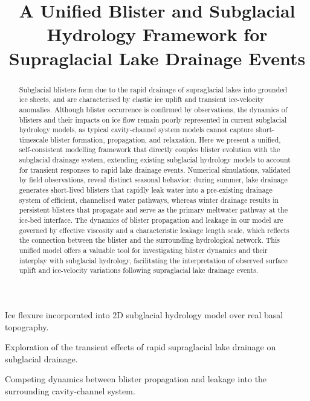 \documentclass[draft]{agujournal2019}
\begin{document}
\title{A Unified Blister and Subglacial Hydrology Framework for Supraglacial Lake Drainage Events}




\begin{keypoints}

\item Ice flexure incorporated into 2D subglacial hydrology model over real basal topography.

\item Exploration of the transient effects of rapid supraglacial lake drainage on subglacial drainage.

\item Competing dynamics between blister propagation and leakage into the surrounding cavity-channel system.

\end{keypoints}

\begin{abstract}
Subglacial blisters form due to the rapid drainage of supraglacial lakes into grounded ice sheets, and are characterised by elastic ice uplift and transient ice-velocity anomalies. Although blister occurrence is confirmed by observations, the dynamics of blisters and their impacts on ice flow remain poorly represented in current subglacial hydrology models, as typical cavity-channel system models cannot capture short-timescale blister formation, propagation, and relaxation. Here we present a unified, self-consistent modelling framework that directly couples blister evolution with the subglacial drainage system, extending existing subglacial hydrology models to account for transient responses to rapid lake drainage events. Numerical simulations, validated by field observations, reveal distinct seasonal behavior: during summer, lake drainage generates short-lived blisters that rapidly leak water into a pre-existing drainage system of efficient, channelised water pathways, whereas winter drainage results in persistent blisters that propagate and serve as the primary meltwater pathway at the ice-bed interface. The dynamics of blister propagation and leakage in our model are governed by effective viscosity and a characteristic leakage length scale, which reflects the connection between the blister and the surrounding hydrological network. This unified model offers a valuable tool for investigating blister dynamics and their interplay with subglacial hydrology, facilitating the interpretation of observed surface uplift and ice-velocity variations following supraglacial lake drainage events.
\end{abstract}
\end{document}
